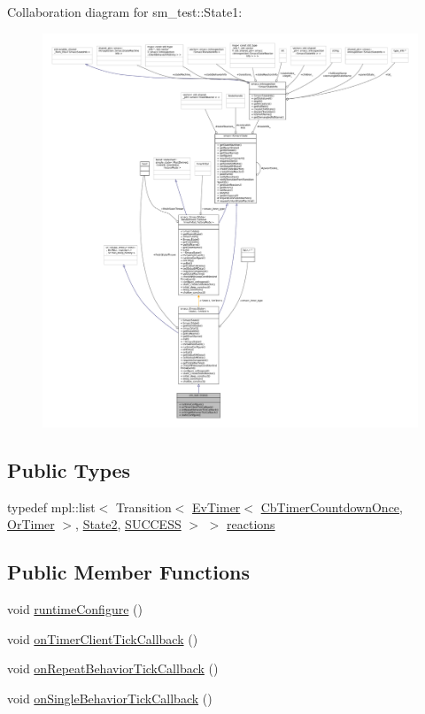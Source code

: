 Collaboration diagram for sm\+\_\+test\+:\+:State1\+:
\nopagebreak
\begin{figure}[H]
\begin{center}
\leavevmode
\includegraphics[width=350pt]{structsm__test_1_1State1__coll__graph}
\end{center}
\end{figure}
\subsection*{Public Types}
\begin{DoxyCompactItemize}
\item 
typedef mpl\+::list$<$ Transition$<$ \hyperlink{structros__timer__client_1_1EvTimer}{Ev\+Timer}$<$ \hyperlink{classros__timer__client_1_1CbTimerCountdownOnce}{Cb\+Timer\+Countdown\+Once}, \hyperlink{classsm__test_1_1OrTimer}{Or\+Timer} $>$, \hyperlink{structsm__test_1_1State2}{State2}, \hyperlink{structsmacc_1_1default__transition__tags_1_1SUCCESS}{S\+U\+C\+C\+E\+SS} $>$ $>$ \hyperlink{structsm__test_1_1State1_a6c078d96ea6d143f61013818aaba7030}{reactions}
\end{DoxyCompactItemize}
\subsection*{Public Member Functions}
\begin{DoxyCompactItemize}
\item 
void \hyperlink{structsm__test_1_1State1_aa83e2eb5a7e9a479c5f246b63b473d33}{runtime\+Configure} ()
\item 
void \hyperlink{structsm__test_1_1State1_ae4a890c0c2644510cefdc7087df3f2b3}{on\+Timer\+Client\+Tick\+Callback} ()
\item 
void \hyperlink{structsm__test_1_1State1_ae05b64978977a2cb12219caa2c2626fb}{on\+Repeat\+Behavior\+Tick\+Callback} ()
\item 
void \hyperlink{structsm__test_1_1State1_a54da744e6cff37d85b2dd9bff49a6005}{on\+Single\+Behavior\+Tick\+Callback} ()
\end{DoxyCompactItemize}
